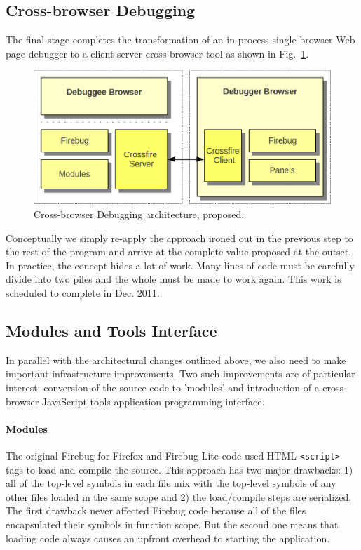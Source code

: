 \subsection{Cross-browser Debugging}
The final stage completes the transformation of an in-process single browser Web
page debugger to a client-server cross-browser tool as shown in
Fig.~\ref{fig:crossbrowser}. \begin{figure}[htp]
  \includegraphics  [width = 86 mm] {figures/crossbrowser.png}
  \caption{Cross-browser Debugging architecture, proposed.}
 \label{fig:crossbrowser}
\end{figure}
Conceptually we simply re-apply the approach ironed out in the previous step to
the rest of the program and arrive at the complete value proposed at the outset.
In practice, the concept hides a lot of work. Many lines of code must be
carefully divide into two piles and the whole must be made to work again. This
work is scheduled to complete in Dec. 2011.

\subsection{Modules and Tools Interface}
In parallel with the architectural changes outlined above, we also need to make
important infrastructure improvements. Two such improvements are of particular
interest: conversion of the source code to 'modules' and introduction of a
cross-browser JavaScript tools application programming interface.


\paragraph{Modules} The original Firebug for Firefox and Firebug Lite code used
HTML \texttt{<script>} tags to load and compile the source. This approach has
two major drawbacks: 1) all of the top-level symbols in each file mix with the
top-level symbols of any other files loaded in the same scope and 2) the
load/compile steps are serialized. The first drawback never affected Firebug
code because all of the files encapsulated their symbols in function scope. But
the second one means that loading code always causes an upfront overhead to
starting the application.


